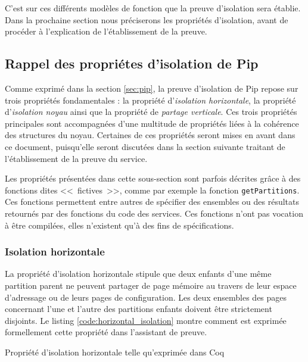 		C'est sur ces différents modèles de fonction que la preuve d'isolation sera établie. Dans la prochaine section nous préciserons les propriétés d'isolation, avant de procéder à l'explication de l'établissement de la preuve.

		\subsection{Rappel des propriétes d'isolation de Pip}

		Comme exprimé dans la section \ref{sec:pip}, la preuve d'isolation de Pip repose sur trois propriétés fondamentales : la propriété d'\emph{isolation horizontale}, la propriété d'\emph{isolation noyau} ainsi que la propriété de \emph{partage verticale}. Ces trois propriétés principales sont accompagnées d'une multitude de propriétés liées à la cohérence des structures du noyau. Certaines de ces propriétés seront mises en avant dans ce document, puisqu'elle seront discutées dans la section suivante traitant de l'établissement de la preuve du service.

		Les propriétés présentées dans cette sous-section sont parfois décrites grâce à des fonctions dites <<~fictives~>>, comme par exemple la fonction \texttt{getPartitions}. Ces fonctions permettent entre autres de spécifier des ensembles ou des résultats retournés par des fonctions du code des services. Ces fonctions n'ont pas vocation à être compilées, elles n'existent qu'à des fins de spécifications.

			\subsubsection{Isolation horizontale}

			La propriété d'isolation horizontale stipule que deux enfants d'une même partition parent ne peuvent partager de page mémoire au travers de leur espace d'adressage ou de leurs pages de configuration. Les deux ensembles des pages concernant l'une et l'autre des partitions enfants doivent être strictement disjoints. Le listing \ref{code:horizontal_isolation} montre comment est exprimée formellement cette propriété dans l'assistant de preuve.

			\begin{listing}[!ht]
				\caption{Propriété d'isolation horizontale telle qu'exprimée dans Coq}
				\label{code:horizontal_isolation}
			\end{listing}

